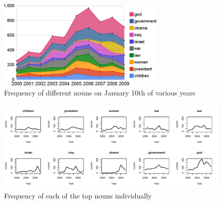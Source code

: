 
\begin{figure}[tb]
	\begin{center}
	\includegraphics[width=8cm]{images/year_nouns.png}
	\caption{Frequency of different nouns on January 10th of various years}
	\label{year_nouns}
	\end{center}
\end{figure}

\begin{figure}[tb]
	\begin{center}
	\includegraphics[width=18cm]{images/multiPlot.pdf}
	\caption{Frequency of each of the top nouns individually}
	\label{multiplot_nouns}
	\end{center}
\end{figure}